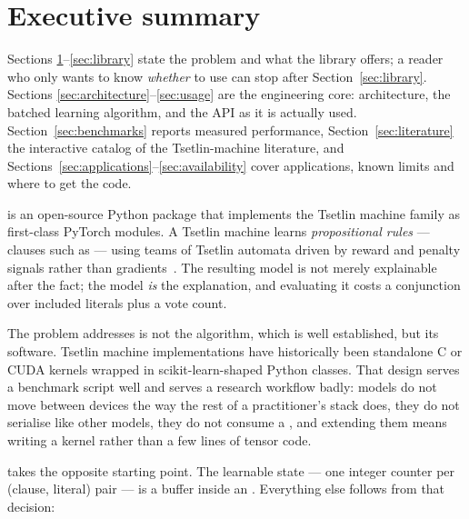 \section{Executive summary}
\label{sec:summary}

\begin{ttcallout}
Sections \ref{sec:summary}--\ref{sec:library} state the problem and what the library offers;
a reader who only wants to know \emph{whether} to use \ttlibname can stop after
Section~\ref{sec:library}. Sections \ref{sec:architecture}--\ref{sec:usage} are the
engineering core: architecture, the batched learning algorithm, and the API as it is actually
used. Section~\ref{sec:benchmarks} reports measured performance,
Section~\ref{sec:literature} the interactive catalog of the Tsetlin-machine literature, and
Sections~\ref{sec:applications}--\ref{sec:availability} cover applications, known limits and
where to get the code.
\end{ttcallout}

\ttlibname is an open-source Python package that implements the Tsetlin machine family as
first-class PyTorch modules. A Tsetlin machine learns \emph{propositional rules} --- clauses
such as  --- using teams of Tsetlin automata driven by
reward and penalty signals rather than gradients~. The resulting model is not
merely explainable after the fact; the model \emph{is} the explanation, and evaluating it
costs a conjunction over included literals plus a vote count.

The problem \ttlibname addresses is not the algorithm, which is well established, but its
software. Tsetlin machine implementations have historically been standalone C or CUDA kernels
wrapped in scikit-learn-shaped Python classes. That design serves a benchmark script well and
serves a research workflow badly: models do not move between devices the way the rest of a
practitioner's stack does, they do not serialise like other models, they do not consume a
, and extending them means writing a kernel rather than a few lines of
tensor code.

\ttlibname takes the opposite starting point. The learnable state --- one integer counter per
(clause, literal) pair --- is a  buffer inside an . Everything
else follows from that decision:

